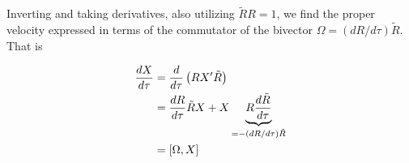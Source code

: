 %
Inverting and taking derivatives, also utilizing $\tilde{R}{R} = 1$, we find the proper velocity expressed in terms of the commutator of the bivector $\Omega = (dR/d\tau) \tilde{R}$.   That is

\begin{align*}
\frac{dX}{d\tau} 
&= \frac{d}{d\tau} \left( R X' \tilde{R} \right) \\
&= \frac{dR }{d\tau} \tilde{R} X + X \underbrace{R \frac{d\tilde{R}}{d\tau}}_{= - (dR/d\tau) \tilde{R}} \\
&= \left[{ \Omega },{X}\right]
\end{align*}



\EndArticle

